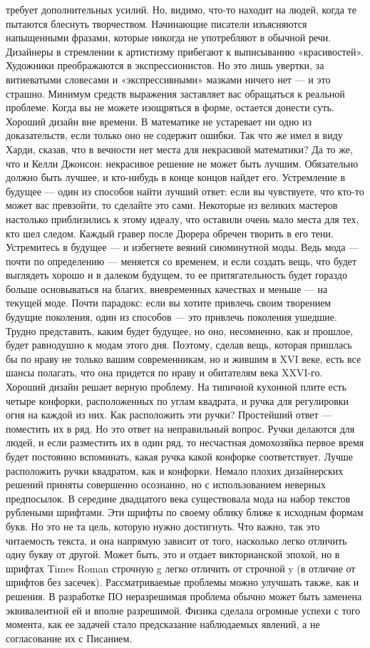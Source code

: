\documentclass[ebook,12pt,oneside,openany]{memoir}
\begin{document}
требует дополнительных усилий. Но, видимо, что-то находит на людей,
когда те пытаются блеснуть творчеством. Начинающие писатели
изъясняются напыщенными фразами, которые никогда не употребляют в
обычной речи. Дизайнеры в стремлении к артистизму прибегают к
выписыванию «красивостей». Художники преображаются в экспрессионистов.
Но это лишь увертки, за витиеватыми словесами и «экспрессивными»
мазками ничего нет — и это страшно. Минимум средств выражения
заставляет вас обращаться к реальной проблеме. Когда вы не можете
изощряться в форме, остается донести суть. Хороший дизайн вне времени.
В математике не устаревает ни одно из доказательств, если только оно
не содержит ошибки. Так что же имел в виду Харди, сказав, что в
вечности нет места для некрасивой математики? Да то же, что и Келли
Джонсон: некрасивое решение не может быть лучшим. Обязательно должно
быть лучшее, и кто-нибудь в конце концов найдет его. Устремление в
будущее — один из способов найти лучший ответ: если вы чувствуете, что
кто-то может вас превзойти, то сделайте это сами. Некоторые из великих
мастеров настолько приблизились к этому идеалу, что оставили очень
мало места для тех, кто шел следом. Каждый гравер после Дюрера обречен
творить в его тени. Устремитесь в будущее — и избегнете веяний
сиюминутной моды. Ведь мода — почти по определению — меняется со
временем, и если создать вещь, что будет выглядеть хорошо и в далеком
будущем, то ее притягательность будет гораздо больше основываться на
благих, вневременных качествах и меньше — на текущей моде. Почти
парадокс: если вы хотите привлечь своим творением будущие поколения,
один из способов — это привлечь поколения ушедшие. Трудно представить,
каким будет будущее, но оно, несомненно, как и прошлое, будет
равнодушно к модам этого дня. Поэтому, сделав вещь, которая пришлась
бы по нраву не только вашим современникам, но и жившим в XVI веке,
есть все шансы полагать, что она придется по нраву и обитателям века
XXVI-го. Хороший дизайн решает верную проблему. На типичной кухонной
плите есть четыре конфорки, расположенных по углам квадрата, и ручка
для регулировки огня на каждой из них. Как расположить эти ручки?
Простейший ответ — поместить их в ряд. Но это ответ на неправильный
вопрос. Ручки делаются для людей, и если разместить их в один ряд, то
несчастная домохозяйка первое время будет постоянно вспоминать, какая
ручка какой конфорке соответствует. Лучше расположить ручки квадратом,
как и конфорки. Немало плохих дизайнерских решений приняты совершенно
осознанно, но с использованием неверных предпосылок. В середине
двадцатого века существовала мода на набор текстов рублеными шрифтами.
Эти шрифты по своему облику ближе к исходным формам букв. Но это не та
цель, которую нужно достигнуть. Что важно, так это читаемость текста,
и она напрямую зависит от того, насколько легко отличить одну букву от
другой. Может быть, это и отдает викторианской эпохой, но в шрифтах
Times Roman строчную g легко отличить от строчной y (в отличие от
шрифтов без засечек). Рассматриваемые проблемы можно улучшать также,
как и решения. В разработке ПО неразрешимая проблема обычно может быть
заменена эквивалентной ей и вполне разрешимой. Физика сделала огромные
успехи с того момента, как ее задачей стало предсказание наблюдаемых
явлений, а не согласование их с Писанием.
\end{document}
